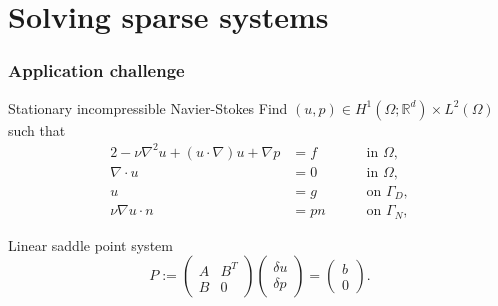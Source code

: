 \documentclass[presentation]{beamer}
\newcommand{\honev}{\ensuremath{{H}^1(\Omega; \mathbb{R}^d)}\xspace}
\newcommand{\ltwo}{\ensuremath{{L}^2(\Omega)}\xspace}
\newcommand{\advect}[2]{\ensuremath{(#2 \cdot \nabla) #1}}
\begin{document}
\section{Solving sparse systems}

\begin{frame}
  \frametitle{Application challenge}
  \begin{block}{Stationary incompressible Navier-Stokes}
    Find $(u, p) \in \honev \times \ltwo$ such that
    \begin{alignat*}{2}
      -  \nu \nabla^2 u + \advect{u}{u} + \nabla p &= f \quad && \text{ in } \Omega, \label{eqn:momentum} \\
      \nabla \cdot u &= 0 \quad && \text{ in } \Omega, \\
      u &= g \quad && \text{ on } \Gamma_D, \\
      \nu \nabla u \cdot n &= pn \quad && \text{ on } \Gamma_N,
    \end{alignat*}
  \end{block}
  \begin{block}{Linear saddle point system}
    \begin{equation*}
      P := \begin{pmatrix}
        A & B^T \\
        B & 0
      \end{pmatrix}
      \begin{pmatrix}
        \delta u \\ \delta p
      \end{pmatrix}
      =
      \begin{pmatrix}
        b \\ 0
      \end{pmatrix}.
    \end{equation*}
  \end{block}
\end{frame}
\end{document}
